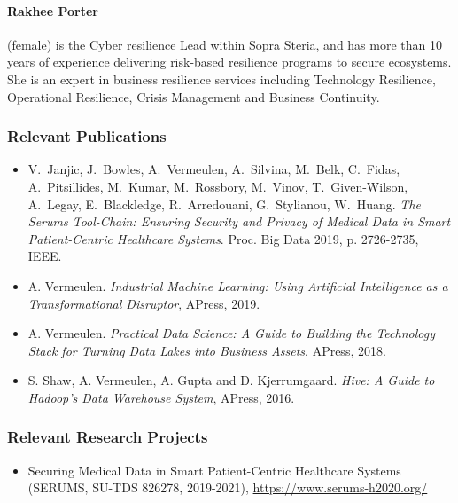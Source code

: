 \documentclass[a4paper,11pt]{article}
\begin{document}
\paragraph{Rakhee Porter}  (female) is the Cyber resilience Lead within Sopra Steria, and has
more than 10 years of experience delivering risk-based resilience programs to secure ecosystems. She is an expert in business resilience services including Technology Resilience, Operational Resilience, Crisis Management and Business Continuity.

\subsubsection*{Relevant Publications}

\begin{itemize}
\item V.~Janjic, J.~Bowles, A.~Vermeulen, A.~Silvina, M.~Belk, C.~Fidas, A.~Pitsillides, M.~Kumar, M.~Rossbory, M.~Vinov, T.~Given-Wilson, A.~Legay, E.~Blackledge, R.~Arredouani, G.~Stylianou, W.~Huang. \emph{The Serums Tool-Chain: Ensuring Security and Privacy of Medical Data in Smart Patient-Centric Healthcare Systems}. Proc. Big Data 2019, p. 2726-2735, IEEE.
\item A. Vermeulen. \emph{Industrial Machine Learning: Using Artificial Intelligence as a Transformational Disruptor}, APress, 2019.
\item A. Vermeulen. \emph{Practical Data Science: A Guide to Building the Technology Stack for Turning Data Lakes into Business Assets}, APress, 2018.
\item S. Shaw, A. Vermeulen, A. Gupta and D. Kjerrumgaard.  \emph{Hive: A Guide to Hadoop’s Data Warehouse System}, APress, 2016.

\end{itemize}

\subsubsection*{Relevant Research Projects}
\begin{itemize}
\item Securing Medical Data in Smart Patient-Centric Healthcare Systems (SERUMS, SU-TDS 826278, 2019-2021),  \url{https://www.serums-h2020.org/}
\end{itemize}


\end{document}
